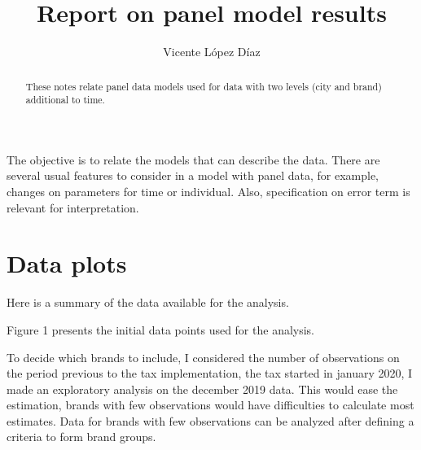\documentclass[]{article}
\title{Report on panel model results}
\author{Vicente López Díaz}
\begin{document}
\maketitle

\begin{abstract}
These notes relate panel data models used for data with two levels (city and brand) additional to time.
\end{abstract}

The objective is to relate the models that can describe the data. There are several usual features to consider in a model with panel data, for example, changes on parameters for time or individual. Also, specification on error term is relevant for interpretation.

\section{Data plots}
Here is a summary of the data available for the analysis. 

Figure 1 presents the initial data points used for the analysis.

To decide which brands to include, I considered the number of observations on the period previous to the tax implementation, the tax started in january 2020, I made an exploratory analysis on the december 2019 data. This would ease the estimation, brands with few observations would have difficulties to calculate most estimates. Data for brands with few observations can be analyzed after defining a criteria to form brand groups.
\end{document}

